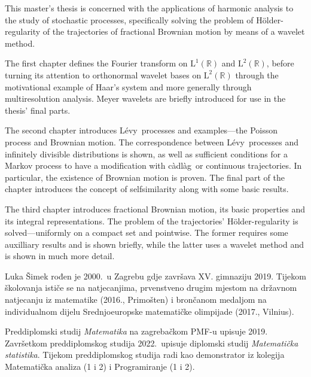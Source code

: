\documentclass[a4paper,twoside,12pt]{memoir}
\numberwithin{teorem}{section}
\numberwithin{equation}{chapter}
\numberwithin{figure}{chapter}
\numberwithin{table}{chapter}
\newcommand{\R}{\mathbb{R}}
\newcommand{\holder}{H\" older}
\newcommand{\cadlag}{c\` adl\` ag}
\newcommand{\levy}{L\' evy}
\def\L{\mathrm{L}}
\begin{document}
\begin{summary}
	This master's thesis is concerned with the applications of harmonic analysis to the study
	of stochastic processes, specifically solving the problem of \holder -regularity of the trajectories
	of fractional Brownian motion by means of a wavelet method.

	The first chapter defines the Fourier transform on \( \L^1(\R) \) and
	\( \L^2(\R) \), before turning its attention to orthonormal wavelet bases
	on \( \L^2(\R) \) through the motivational example of Haar's system and
	more generally through multiresolution analysis. Meyer wavelets are briefly introduced
	for use in the thesis' final parts.

	The second chapter introduces \levy \ processes and examples---the Poisson process and
	Brownian motion. The correspondence between \levy \ processes and infinitely divisible
	distributions is shown, as well as sufficient conditions for a Markov process to have a
	modification with \cadlag \ or continuous trajectories. In particular, the existence of
	Brownian motion is proven. The final part of the chapter introduces
	the concept of selfsimilarity along with some basic results.

	The third chapter introduces fractional Brownian motion, its basic properties and
	its integral representations. The problem of the trajectories' \holder -regularity
	is solved---uniformly on a compact set and pointwise. The former
	requires some auxilliary results and is shown briefly, while the latter
	uses a wavelet method and is shown in much more detail.
\end{summary}

\begin{cv}
	Luka Šimek rođen je 2000.\ u Zagrebu gdje završava XV. gimnaziju 2019. Tijekom školovanja ističe se na natjecanjima, prvenstveno drugim mjestom na državnom natjecanju iz matematike (2016., Primošten) i brončanom medaljom na individualnom dijelu Srednjoeuropske matematičke olimpijade (2017., Vilnius).

	Preddiplomski studij \emph{Matematika} na zagrebačkom PMF-u upisuje 2019. Završetkom preddiplomskog studija 2022.\ upisuje diplomski studij \emph{Matematička statistika}.
	Tijekom preddiplomskog studija radi kao demonstrator iz kolegija Matematička analiza (1 i 2) i Programiranje (1 i 2).
\end{cv}
\end{document}
